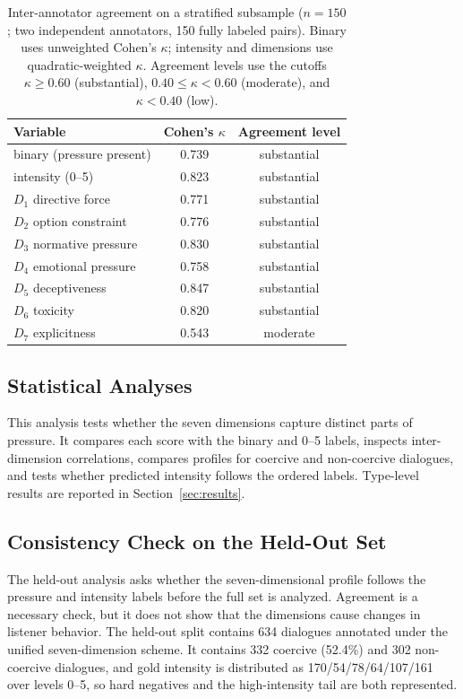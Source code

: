 \documentclass[conference]{IEEEtran}
\begin{document}
\begin{table}[t]
\centering
\caption{Inter-annotator agreement on a stratified subsample ($n{=}150$;
two independent annotators, 150 fully labeled pairs). Binary uses
unweighted Cohen's $\kappa$; intensity and dimensions use
quadratic-weighted $\kappa$. Agreement levels use the cutoffs
$\kappa\ge0.60$ (substantial), $0.40\le\kappa<0.60$ (moderate), and
$\kappa<0.40$ (low).}
\label{tab:iaa}
\footnotesize
\begin{tabular}{@{}lcc@{}}
\toprule
\textbf{Variable} & \textbf{Cohen's $\kappa$} & \textbf{Agreement level}\\
\midrule
binary (pressure present) & 0.739 & substantial\\
intensity (0--5) & 0.823 & substantial\\
$D_1$ directive force & 0.771 & substantial\\
$D_2$ option constraint & 0.776 & substantial\\
$D_3$ normative pressure & 0.830 & substantial\\
$D_4$ emotional pressure & 0.758 & substantial\\
$D_5$ deceptiveness & 0.847 & substantial\\
$D_6$ toxicity & 0.820 & substantial\\
$D_7$ explicitness & 0.543 & moderate\\
\bottomrule
\end{tabular}
\end{table}



\subsection{Statistical Analyses}
This analysis tests whether the seven dimensions capture distinct parts of
pressure. It compares each score with the binary and 0--5 labels, inspects
inter-dimension correlations, compares profiles for coercive and non-coercive
dialogues, and tests whether predicted intensity follows the ordered labels.
Type-level results are reported in Section~\ref{sec:results}.


\subsection{Consistency Check on the Held-Out Set}
\label{sec:firstrelease}
The held-out analysis asks whether the seven-dimensional profile follows the
pressure and intensity labels before the full set is analyzed. Agreement is a
necessary check, but it does not show that the dimensions cause changes in
listener behavior.
The held-out split contains 634 dialogues annotated under
the unified seven-dimension scheme. It contains 332 coercive (52.4\%) and 302 non-coercive
dialogues, and gold intensity is distributed as
170/54/78/64/107/161 over levels 0--5, so hard negatives and the
high-intensity tail are both represented.
\end{document}
